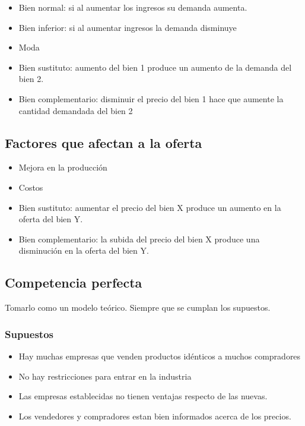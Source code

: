 \documentclass[titlepage,a4paper]{article}
\begin{document}
\begin{itemize}
\item Bien normal: si al aumentar los ingresos su demanda aumenta.
\item Bien inferior: si al aumentar ingresos la demanda disminuye
\item Moda
\item Bien sustituto: aumento del bien 1 produce un aumento de la demanda del bien 2.
\item Bien complementario: disminuir el precio del bien 1 hace que aumente la cantidad demandada del bien 2
\end{itemize}

\subsection*{Factores que afectan a la oferta}

\begin{itemize}
\item Mejora en la producción
\item Costos
\item Bien sustituto: aumentar el precio del bien X produce un aumento en la oferta del bien Y.
\item Bien complementario: la subida del precio del bien X produce una disminución en la oferta del bien Y.
\end{itemize}

\subsection*{Competencia perfecta}
Tomarlo como un modelo teórico. Siempre que se cumplan los supuestos.


\subsubsection*{Supuestos}

\begin{itemize}
\item Hay muchas empresas que venden productos idénticos a muchos compradores
\item No hay restricciones para entrar en la industria
\item Las empresas establecidas no tienen ventajas respecto de las nuevas.
\item Los vendedores y compradores estan bien informados acerca de los precios.
\end{itemize}
\end{document}
